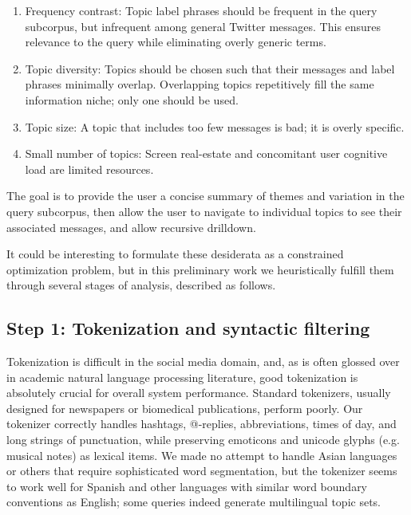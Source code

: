 \documentclass[letterpaper]{article}
\newcommand{\bto}[1]{\textcolor{blue}{\textbf{[#1 --BTO]}}}
\begin{document}
\begin{enumerate}
\item Frequency contrast: Topic label phrases should be frequent in the query subcorpus, but infrequent among general Twitter messages.  This ensures relevance to the query while eliminating overly generic terms.
\item Topic diversity: Topics should be chosen such that their messages and label phrases minimally overlap.  Overlapping topics repetitively fill the same information niche; only one should be used.
\item Topic size: A topic that includes too few messages is bad; it is overly specific.
\item Small number of topics: Screen real-estate and concomitant user cognitive load are limited resources.
\end{enumerate}

The goal is to provide the user a concise summary of themes and variation in the query subcorpus, then allow the user to navigate to individual topics to see their associated messages, and allow recursive drilldown.

It could be interesting to formulate these desiderata as a constrained optimization problem,
but in this preliminary work we heuristically fulfill them through several stages of analysis, described as follows.  %

\subsection{Step 1: Tokenization and syntactic filtering}

Tokenization is difficult in the social media domain, and, as is often glossed over in academic natural language processing literature, good tokenization is absolutely crucial for overall system performance.  Standard tokenizers, usually designed for newspapers or biomedical publications, perform poorly.  Our tokenizer correctly handles hashtags, @-replies, abbreviations, times of day, and long strings of punctuation, while preserving emoticons and unicode glyphs (e.g. musical notes) as lexical items.  We made no attempt to handle Asian languages or others that require sophisticated word segmentation, but the tokenizer seems to work well for Spanish and other languages with similar word boundary conventions as English; some queries indeed generate multilingual topic sets.
\end{document}
